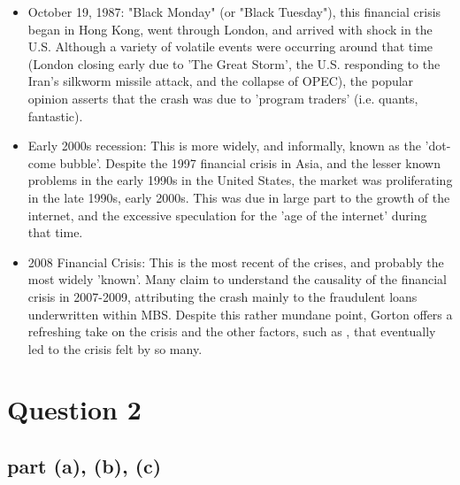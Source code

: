\documentclass[12pt]{article}
\begin{document}
		\begin{itemize}
		
			\item October 19, 1987: "Black Monday" (or "Black Tuesday"), this financial crisis began in Hong Kong, went through London, and arrived with shock in the U.S.
					  Although a variety of volatile events were occurring around that time (London closing early due to 'The Great Storm', the U.S. responding to the Iran's
					  silkworm missile attack, and the collapse of OPEC), the popular opinion asserts that the crash was due to 'program traders' (i.e. quants, fantastic). 
					  
			\item Early 2000s recession: This is more widely, and informally, known as the 'dot-come bubble'. Despite the 1997 financial crisis in Asia, and the lesser known
					  problems in the early 1990s in the United States, the market was proliferating in the late 1990s, early 2000s. This was due in large part to the growth of the
					  internet, and the excessive speculation for the 'age of the internet' during that time. 
					  
			\item 2008 Financial Crisis: This is the most recent of the crises, and probably the most widely 'known'. Many claim to understand the causality of the financial crisis 
					  in 2007-2009, attributing the crash mainly to the fraudulent loans underwritten within MBS. Despite this rather mundane point, Gorton offers a refreshing take 
					  on the crisis and the other factors, such as , that eventually led to the crisis felt by so many.
		
		\end{itemize}				
		
\newpage

\section{Question 2}
		
		\subsection{part (a), (b), (c)}
		
\end{document}
